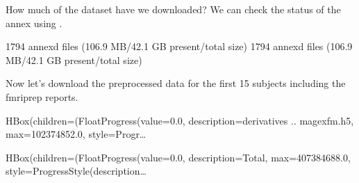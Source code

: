 \documentclass[letterpaper,10pt,english]{sphinxmanual}
\begin{document}
How much of the dataset have we downloaded?  We can check the status of the annex using .

\begin{sphinxVerbatim}[commandchars=\\\{\}]
  
\end{sphinxVerbatim}

\begin{sphinxVerbatim}[commandchars=\\\{\}]
1794 annex\PYGZsq{}d files (106.9 MB/42.1 GB present/total size)
1794 annex\PYGZsq{}d files (106.9 MB/42.1 GB present/total size)
\end{sphinxVerbatim}

Now let’s download the preprocessed data for the first 15 subjects including the fmriprep reports.

\begin{sphinxVerbatim}[commandchars=\\\{\}]
     
   \PYG{p}{[}\PYG{p}{]}
      
\end{sphinxVerbatim}

\begin{sphinxVerbatim}[commandchars=\\\{\}]
HBox(children=(FloatProgress(value=0.0, description=\PYGZsq{}derivatives .. mage\PYGZus{}xfm.h5\PYGZsq{}, max=102374852.0, style=Progr…
\end{sphinxVerbatim}

\begin{sphinxVerbatim}[commandchars=\\\{\}]
HBox(children=(FloatProgress(value=0.0, description=\PYGZsq{}Total\PYGZsq{}, max=407384688.0, style=ProgressStyle(description\PYGZus{}…
\end{sphinxVerbatim}
\end{document}
